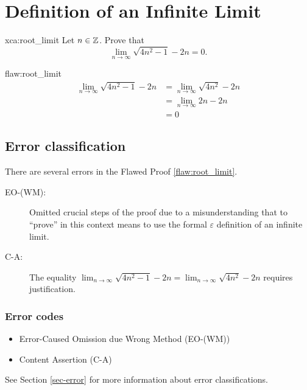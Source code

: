 \section{Definition of an Infinite Limit}

\begin{xca}{xca:root_limit}
Let $n \in \mathbb Z$. Prove that
$$\lim_{n \rightarrow \infty} \sqrt{4n^2-1} - 2n = 0.$$
\end{xca}

\begin{flaw}{flaw:root_limit} %
\begin{align*}
    \lim_{n \rightarrow \infty} \sqrt{4n^2-1} - 2n &= \lim_{n \rightarrow \infty} \sqrt{4n^2} - 2n \\
    &= \lim_{n \rightarrow \infty} 2n - 2n \\
    &= 0
\end{align*}
\end{flaw}

\clearpage
\subsection{Error classification}


There are several errors
 in the Flawed Proof \ref{flaw:root_limit}. %


 \begin{description}
 	\item[EO-(WM):] Omitted crucial steps of the proof due to a misunderstanding that to ``prove'' in this context means to use the formal $\varepsilon$ definition of an infinite limit.
 	\item[C-A:] The equality $\displaystyle\lim_{n \rightarrow \infty} \sqrt{4n^2-1} - 2n = \lim_{n \rightarrow \infty} \sqrt{4n^2} - 2n$ requires justification.
 \end{description}

\subsubsection{Error codes}
\begin{itemize}
	\item 	Error-Caused Omission due Wrong Method (EO-(WM))
	\item   Content Assertion (C-A)
\end{itemize}
See Section \ref{sec-error} for more information about error classifications.

